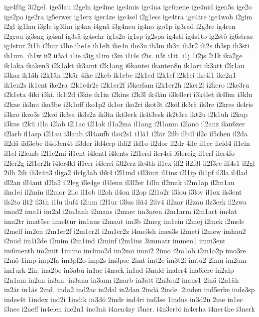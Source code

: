 {ige4füg
3i2gel.
ige5lau
i2geln
ige4me
ige4mis
ige4na
ige6nene
ige4nid
igen5s
ige2o
ige2pa
ige2ra
ig5erwer
ig1erz
iger4ze
ige4sel
i2g1ess
ige4tra
ige4tre
ige4woh
i2gim
i2gl
ig1lau
i3gle
ig3lim
ig4na
i4gnä
i3g4neu
ig4no
igo1p
ig3rad
i2g3re
ig4ren
i2grou
ig3sag
ig4sal
ig3sä
ig4schr
ig1s2o
ig1sp
ig2spa
ig4sti
ig4s1to
ig2stö
ig6stras
ig4stur
2i1h
i2har
i3he
ihe1e
ih1elt
ihe4n
ihe3u
ih3m
ih3n
ih3r2
ih2s
ih3sp
ih3sti
ih1um.
ih1w
ii2
ii3a4
i1ie
i3ig
i1im
i3in
i1i4s
i2is.
ii3t
i1it.
i1j
1i2js
2i1k
ika2ge
ik1aka
ikaken3
i2k1akt
ik3amt
i2k1ang
i6kantei
ikanten8n
ik1art
ik3att
i2k1au
i3kaz
ik1äh
i2k1än
i2kär
4ike
i2keb
ik1ebe
i2k1ed
i2k1ef
i2k1ei
ike4l1
ike2n1
ik1en2s
ik1ent
ike2ra
i2k1e4r2e
i2k1er2f
i5kerfam
i2k1er2h
i2ker2l
i2kero
i2ke3ru
i2k1eta
4iki
i3ki.
ik1i2d
i3kie
ik1in
i2kins
i2k3l
ik4län
i3k4leri
i3k4let
ik4lim
i3klu
i2kne
ik3nu
iko3be
i2k1off
iko1p2
ik1or
iko2ri
ikot3t
i2köl
ik3rä
ik3re
i2kres
ik4ris
i3kro
ikro3s
i2krö
ik3sa
ik3s2z
ik3ta
ikt3erk
ik4t3esk
ik2t3re
ikt2u
i2k1uh
i2kup
i3kus
i2kü
i1la
i2lab
i2l1ac
i2l1ak
il1a2ma
il1ang
i2l1anm
i2lano
il2anz
ilan6zer
i2larb
il1asp
i2l1au
i3laub
i3l4aufb
ilau2s1
i1lä1
i2lär
2ilb
ilb4l
il2c
il5chen
il2da
il2dä
ild3ebe
il4d3en4t
il3der
ild4erp
ildi2
ild1o
il2dor
il2dr
4ile
il1ec
ileid4
il1ein
il1el
i2lemb
i2l1e2mi
il1ent
i4lentl
i4lents
i2l1erd
iler4ei
i6lereig
il1erf
iler4fo
i2ler2g
i2l1er2h
i4ler4kl
il1err
i4lerri
i3l2erz
ile4th
il1ex
ilf2
il2f3l
il2f3re
ilf4s1
il2gl
2ilh
2ili
ili3e4n3
iliga2
ili4g3ab
ilik4
i2l1ind
i4l3init
il1ins
i2l1ip
ili1pf
il3la
il4lad
ill2an
ill4ant
il2lä2
il2leg
ille4ge
il4lenn
il3l2er
1illu
il2mak
il2m1ap
il2m1au
ilm1ei
il2min
il2mor
2ilo
il1ob
il2oh
il4on
il2op
i2l1o2r
i3lou
i3lov
il1ox
ils3ent
ils2to
ilt2
il3th
i1lu
iluf4
i2lum
i2l1ur
i3lus
ilü4
2ilv4
il2zar
il2zau
ilz3erk
il2zwa
imad2
ima1i
im2al
i2m3anh
i2mans
i2marc
im3aren
i2m1arm
i2m1art
im4at
ima2tr
imat5sc
ima4tur
im1aus
i2maut
im3b
i2meg
im1ein
i2mej
i2mek
i2mele
i2melf
im2en
i2m1er2f
i2m1er2l
i2m1er2z
i4me3sh
imes3s
i2meti
i2mew
imhau2
i2mid
im1i2de
i2mim
i2m1ind
i2minf
i2m1ins
3immatr
immen1
imm3ent
im6menth
im2mit
1immo
im4mo2d
im2mö
imni2
2imo
i2m1ob
i2m1o2p
imo3re
i2mö
1imp
imp2fa
im3pf2o
imp2s
im3pse
2imt
imt2e
im3t2i
imtu2
2imu
im2um
im1urk
2in.
ina2be
in3abu
in1ac
i4nack
in1ad
i3nald
inaler4
ina6lere
in2alp
i2n1am
in2an
in3an.
in3ana
in3ann
i2narb
in3att
i2n3au2
inaus1
2inä
i2n1äh
in2är
in1äs
2ind.
inda2
ind2ac
in2dal
in2dan
2indä
2inde.
2inden
ind5erke
inde3sp
indes4t
1index
ind2i
1indik
in3dö
2indr
ind4ri
ind3se
1indus
in3d2ü
2ine
in1ec
i3nee
i2neff
in4elen
ine2n1
ine3nä
i4nen4zy
i5ner.
i4n3erbi
in4erha
i4ner4he
i3nerk
}

